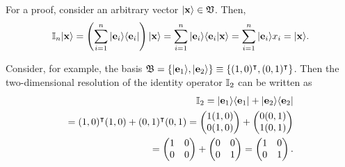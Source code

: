 {%

For a proof, consider an arbitrary vector $\vert {\bf x} \rangle  \in {\frak V}$.
Then,
\begin{equation}
 {\Bbb I}_n \vert {\bf x} \rangle
 =
\left(\sum_{i=1}^n \vert {\bf e}_i \rangle \langle {\bf e}_i \vert \right)
\vert {\bf x} \rangle
=
\sum_{i=1}^n \vert {\bf e}_i \rangle \langle {\bf e}_i \vert {\bf x} \rangle
=
\sum_{i=1}^n \vert {\bf e}_i \rangle  x_i
=  \vert {\bf x} \rangle
.
\end{equation}
}


{%
Consider, for example, the basis
${\frak B}=\{ \vert {\bf e}_1 \rangle , \vert {\bf e}_2 \rangle \} \equiv \{(1,0)^\intercal ,(0,1)^\intercal \}$.
Then the two-dimensional resolution of the identity operator ${\Bbb I}_2$
can be written as
\begin{equation}
\begin{split}
{\Bbb I}_2 =   \vert {\bf e}_1 \rangle \langle  {\bf e}_1 \vert   +     \vert {\bf e}_2 \rangle  \langle  {\bf e}_2 \vert \\
=   (1,0)^\intercal  (1,0) +   (0,1)^\intercal  (0,1)
=
\begin{pmatrix}
1 (1,0) \\  0 (1,0)
\end{pmatrix}
 +
\begin{pmatrix}
0 (0,1)\\
1 (0,1)
\end{pmatrix} \\
 =
\begin{pmatrix}
1 & 0 \\
0 & 0
\end{pmatrix}
+
\begin{pmatrix}
0 & 0 \\
0 & 1
\end{pmatrix}
=
\begin{pmatrix}
1 & 0 \\
0 & 1
\end{pmatrix}
.
\end{split}
\end{equation}

}
